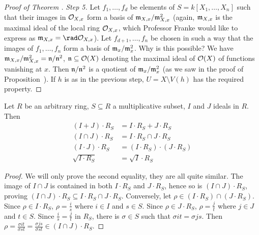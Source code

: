 \documentclass[a4paper,parskip=half,numbers=enddot, DIV=12, headheight=30pt]{scrreprt}
\begin{document}
\begin{proof}[Proof of Theorem ]
    \emph{Step 5.} Let $f_1,\ldots, f_d$ be elements of $S= k[X_1,\ldots, X_n]$ such that their images in $\mathcal{O}_{X,x}$ form a basis of $\mathfrak{m}_{X,x}/\mathfrak{m}_{X,x}^2$ (again, $\mathfrak{m}_{X,x}$ is the maximal ideal of the local ring $\mathcal{O}_{X,x}$, which Professor Franke would like to express as $\mm_{X,x}=\rad \Oo_{X,x}$). Let $f_{d+1},\ldots, f_n$ be chosen in such a way that the images of $f_1,\ldots, f_n$ form a basis of $\mathfrak{m}_x/\mathfrak{m}_x^2$. Why is this possible? We have $\mathfrak{m}_{X,x}/\mathfrak{m}_{X,x}^2=\mathfrak{n}/\mathfrak{n}^2$, $\mathfrak{n}\subseteq\mathcal{O}(X)$ denoting the maximal ideal of $\mathcal{O}(X)$ of functions vanishing at $x$. Then $\mathfrak{n}/\mathfrak{n}^2$ is a quotient of $\mathfrak{m}_x/\mathfrak{m}_x^2$ (as we saw in the proof of Proposition~). If $h$ is as in the previous step, $U= X\setminus V(h)$ has the required property.
\end{proof}
\begin{rem}
    Let $R$ be an arbitrary ring, $S\subseteq R$ a multiplicative subset, $I$ and $J$ ideals in $R$. Then 
    \begin{align*}
        (I+J) \cdot R_S &= I\cdot R_S + J \cdot R_S\\
        (I\cap J)\cdot R_S &= I\cdot R_S \cap J\cdot R_S\\
        (I\cdot J)\cdot R_S &= (I\cdot R_S)\cdot(J\cdot R_S)\\
        \sqrt{I\cdot R_S}&= \sqrt{I}\cdot R_S
    \end{align*}
\end{rem}
\begin{proof}
    We will only prove the second equality, they are all quite similar. The image of $I\cap J$ is contained in both $I\cdot R_S$ and $J\cdot R_S$, hence so is $(I\cap J)\cdot R_S$, proving $(I\cap J) \cdot R_S \subseteq I\cdot R_S \cap J\cdot R_S$. Conversely, let $\rho \in (I \cdot R_S)\cap (J\cdot R_S)$. Since $\rho\in I\cdot R_S$, $\rho = \frac{i}{s}$ where $i\in I$ and $s\in S$. Since $\rho\in J\cdot R_S$, $\rho = \frac{j}{t}$ where $j\in J$ and $t\in S$. Since $\frac{i}{s}=\frac{j}{t}$ in $R_S$, there is $\sigma \in S$ such that $\sigma i t = \sigma  j  s$. Then $\rho = \frac{\sigma  i t}{\sigma  s t} = \frac{\sigma  j s}{\sigma  s t}\in (I\cap J)\cdot R_S$.
\end{proof}
\end{document}
